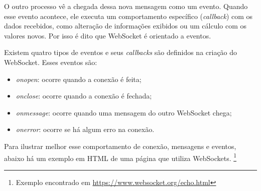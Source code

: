 \documentclass[a4paper,12pt]{article}
\begin{document}
O outro processo vê a chegada dessa nova mensagem como um evento. Quando esse evento acontece, ele executa um comportamento específico (\emph{callback}) com os dados recebidos, como alteração de informações exibidos ou um cálculo com os valores novos. Por isso é dito que WebSocket é orientado a eventos.

Existem quatro tipos de eventos e seus \emph{callbacks} são definidos na criação do WebSocket. Esses eventos são:
\begin{itemize}

\item\emph{onopen}: ocorre quando a conexão é feita;

\item\emph{onclose}: ocorre quando a conexão é fechada;

\item\emph{onmessage}: ocorre quando uma mensagem do outro WebSocket chega;

\item\emph{onerror}: ocorre se há algum erro na conexão.
\end{itemize}


Para ilustrar melhor esse comportamento de conexão, mensagens e eventos, abaixo há um exemplo em HTML de uma página que utiliza WebSockets.
\footnote{Exemplo encontrado em \url{https://www.websocket.org/echo.html}}
\end{document}
